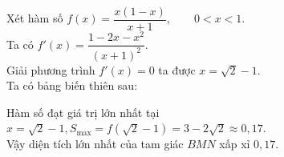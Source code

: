 \begin{ex}
{	Xét hàm số $f(x)=\dfrac{x(1-x)}{x+1}, \qquad 0<x<1$.\\
	Ta có $f'(x) =\dfrac{1-2x-x^2}{(x+1)^2}$.\\
	Giải phương trình $f'(x)=0 $ ta được $x=\sqrt2-1$.\\
	Ta có bảng biến thiên sau:
	\begin{center}
	\end{center}
	Hàm số đạt giá trị lớn nhất tại $x=\sqrt2-1, S_{\max} = f(\sqrt2-1)	=3-2\sqrt2\approx 0{,}17$.\\
	Vậy diện tích lớn nhất của tam giác $BMN$ xấp xỉ $0{,}17$.
	}
\end{ex}


